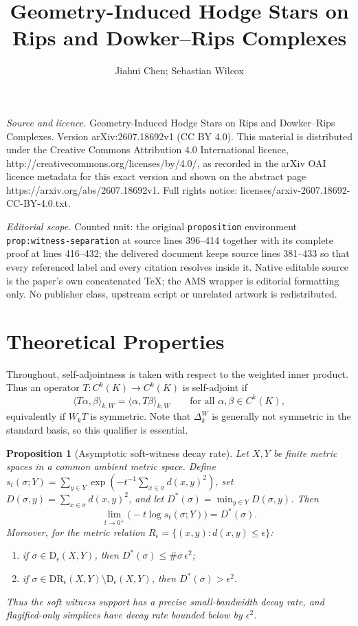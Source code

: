 \documentclass[10pt,a4paper]{amsart}
\newtheorem{proposition}[theorem]{Proposition}
\newcommand{\Dow}{\mathrm{D}}
\newcommand{\DR}{\mathrm{DR}}
\begin{document}
\title[Geometry-Induced Hodge Stars on Rips and Dowker--Rips Comple]{Geometry-Induced Hodge Stars on Rips and Dowker--Rips Complexes}
\author{Jiahui Chen; Sebastian Wilcox}
\date{}
\maketitle
\noindent\emph{Source and licence.} Geometry-Induced Hodge Stars on Rips and Dowker--Rips Complexes. Version arXiv:2607.18692v1 (CC BY 4.0). This material is distributed under the Creative Commons Attribution 4.0 International licence, http://creativecommons.org/licenses/by/4.0/, as recorded in the arXiv OAI licence metadata for this exact version and shown on the abstract page https://arxiv.org/abs/2607.18692v1. Full rights notice: licenses/arxiv-2607.18692-CC-BY-4.0.txt.\par\smallskip
\noindent\textit{Editorial scope.} Counted unit: the original \texttt{proposition} environment \texttt{prop:witness-separation} at source lines 396--414 together with its complete proof at lines 416--432; the delivered document keeps source lines 381--433 so that every referenced label and every citation resolves inside it. Native editable source is the paper's own concatenated TeX; the AMS wrapper is editorial formatting only. No publisher class, upstream script or unrelated artwork is redistributed.
\section{Theoretical Properties}
\label{sec:theory}

Throughout, self-adjointness is taken with respect to the weighted inner product. Thus an operator
$T:C^k(K)\to C^k(K)$ is self-adjoint if
\[
\langle T\alpha,\beta\rangle_{k,W}
=
\langle\alpha,T\beta\rangle_{k,W}
\qquad
\text{for all }\alpha,\beta\in C^k(K),
\]
equivalently if $W_kT$ is symmetric. Note that $\Delta_k^W$ is generally not symmetric in the
standard basis, so this qualifier is essential.


\begin{proposition}[Asymptotic soft-witness decay rate]
\label{prop:witness-separation}
Let $X,Y$ be finite metric spaces in a common ambient metric space. Define
$s_t(\sigma;Y)=\sum_{y\in Y}\exp(-t^{-1}\sum_{x\in\sigma}d(x,y)^2)$, set
$D(\sigma,y)=\sum_{x\in\sigma}d(x,y)^2$, and let
$D^{*}(\sigma)=\min_{y\in Y}D(\sigma,y)$.
Then
\[
\lim_{t\to0^{+}}\bigl(-t\log s_t(\sigma;Y)\bigr)=D^{*}(\sigma).
\]
Moreover, for the metric relation $R_\epsilon=\{(x,y):d(x,y)\le\epsilon\}$:
\begin{enumerate}[leftmargin=2em,label=(\roman*)]
\item if $\sigma\in\Dow_\epsilon(X,Y)$, then $D^{*}(\sigma)\le \#\sigma\,\epsilon^2$;
\item if $\sigma\in\DR_\epsilon(X,Y)\setminus\Dow_\epsilon(X,Y)$, then
$D^{*}(\sigma)>\epsilon^2$.
\end{enumerate}
Thus the soft witness support has a precise small-bandwidth decay rate, and flagified-only
simplices have decay rate bounded below by $\epsilon^2$.
\end{proposition}
\end{document}
